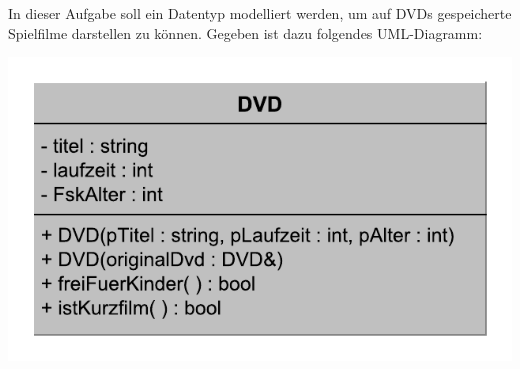 \newcommand{\setfontsize}{11pt}

\lofoot{}


In dieser Aufgabe soll ein Datentyp  modelliert werden, um auf DVDs gespeicherte Spielfilme darstellen zu können. Gegeben ist dazu folgendes UML-Diagramm:

\begin{center}
	\includegraphics[keepaspectratio,scale=0.7]{dvd-uml.pdf}
\end{center}

